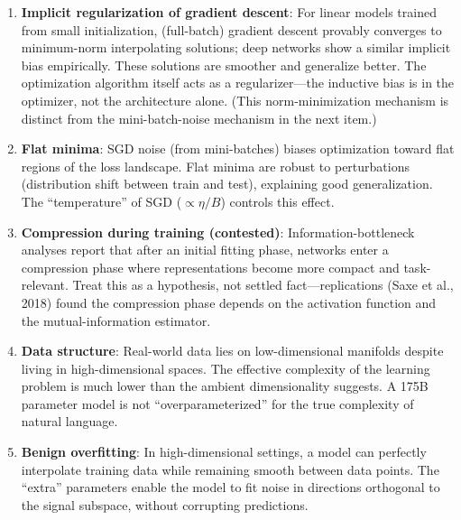 \begin{enumerate}
    \item \textbf{Implicit regularization of gradient descent}: For linear models trained from small initialization, (full-batch) gradient descent provably converges to minimum-norm interpolating solutions; deep networks show a similar implicit bias empirically. These solutions are smoother and generalize better. The optimization algorithm itself acts as a regularizer---the inductive bias is in the optimizer, not the architecture alone. (This norm-minimization mechanism is distinct from the mini-batch-noise mechanism in the next item.)
    \item \textbf{Flat minima}: SGD noise (from mini-batches) biases optimization toward flat regions of the loss landscape. Flat minima are robust to perturbations (distribution shift between train and test), explaining good generalization. The ``temperature'' of SGD ($\propto \eta/B$) controls this effect.
    \item \textbf{Compression during training (contested)}: Information-bottleneck analyses report that after an initial fitting phase, networks enter a compression phase where representations become more compact and task-relevant. Treat this as a hypothesis, not settled fact---replications (Saxe et al., 2018) found the compression phase depends on the activation function and the mutual-information estimator.
    \item \textbf{Data structure}: Real-world data lies on low-dimensional manifolds despite living in high-dimensional spaces. The effective complexity of the learning problem is much lower than the ambient dimensionality suggests. A 175B parameter model is not ``overparameterized'' for the true complexity of natural language.
    \item \textbf{Benign overfitting}: In high-dimensional settings, a model can perfectly interpolate training data while remaining smooth between data points. The ``extra'' parameters enable the model to fit noise in directions orthogonal to the signal subspace, without corrupting predictions.
\end{enumerate}

